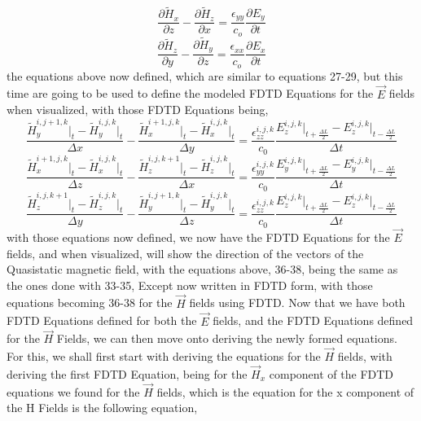 \documentclass[]{article}
\begin{document}
\begin{equation}
\frac{\partial{\tilde{H}}_x}{\partial{z}} - \frac{\partial{\tilde{{H}}}_z}{\partial{x}} = \frac{\epsilon_{yy}}{c_{o}} \frac{\partial{E}_y}{\partial{t}}
\end{equation}
\begin{equation}
\frac{\partial{\tilde{H}}_z}{\partial{y}} - \frac{\partial{\tilde{{H}}}_y}{\partial{z}} = \frac{\epsilon_{xx}}{c_{o}} \frac{\partial{E}_x}{\partial{t}}
\end{equation}
the equations above now defined, which are similar to equations 27-29, but this time are going to be used to define the modeled FDTD Equations for the $\vec{E}$ fields when visualized, with those FDTD Equations being,
\begin{equation}
\frac{\tilde{H}_{y}^{i, j + 1 , k} \Big|_t - \tilde{H}_{y}^{i,j,k}\Big|_t}{\Delta{x}} - \frac{\tilde{H}_{x}^{i + 1, j, k} \Big|_t - \tilde{H}_{x}^{i,j,k}\Big|_t}{\Delta{y}} = \frac{\epsilon_{zz}^{i,j,k}}{c_0} \frac{{E}_{z}^{i,j,k}\Big|_{t+\frac{\Delta{L}}{2}} -E_{z}^{i,j,k}\Big|_{t - \frac{\Delta{L}}{2}}}{\Delta{t}}
\end{equation}
\begin{equation}
\frac{\tilde{H}_{x}^{i+1, j , k} \Big|_t - \tilde{H}_{x}^{i,j,k}\Big|_t}{\Delta{z}} - \frac{\tilde{H}_{z}^{i, j, k + 1} \Big|_t - \tilde{H}_{z}^{i,j,k}\Big|_t}{\Delta{x}} = \frac{\epsilon_{yy}^{i,j,k}}{c_0} \frac{{E}_{y}^{i,j,k}\Big|_{t+\frac{\Delta{L}}{2}} -E_{y}^{i,j,k}\Big|_{t - \frac{\Delta{L}}{2}}}{\Delta{t}}
\end{equation}
\begin{equation}
\frac{\tilde{H}_{z}^{i,j,k+1} \Big|_t - \tilde{H}_{z}^{i,j,k}\Big|_t}{\Delta{y}} - \frac{\tilde{H}_{y}^{i, j + 1, k} \Big|_t - \tilde{H}_{y}^{i,j,k}\Big|_t}{\Delta{z}} = \frac{\epsilon_{zz}^{i,j,k}}{c_0} \frac{{E}_{z}^{i,j,k}\Big|_{t+\frac{\Delta{L}}{2}} -E_{z}^{i,j,k}\Big|_{t - \frac{\Delta{L}}{2}}}{\Delta{t}}
\end{equation}
with those equations now defined, we now have the FDTD Equations for the $\vec{E}$ fields, and when visualized, will show the direction of the vectors of the Quasistatic magnetic field, with the equations above, 36-38, being the same as the ones done with 33-35, Except now written in FDTD form, with those equations becoming 36-38 for the $\vec{H}$ fields using FDTD. Now that we have both FDTD Equations defined for both the $\vec{E}$ fields, and the FDTD Equations defined for the $\vec{H}$ Fields, we can then move onto deriving the newly formed equations. For this, we shall first start with deriving the equations for the $\vec{H}$ fields, with deriving the first FDTD Equation, being for the $\vec{H}_x$ component of the FDTD equations we found for the $\vec{H}$ fields, which is the equation for the x component of the H Fields is the following equation, 
\end{document}
